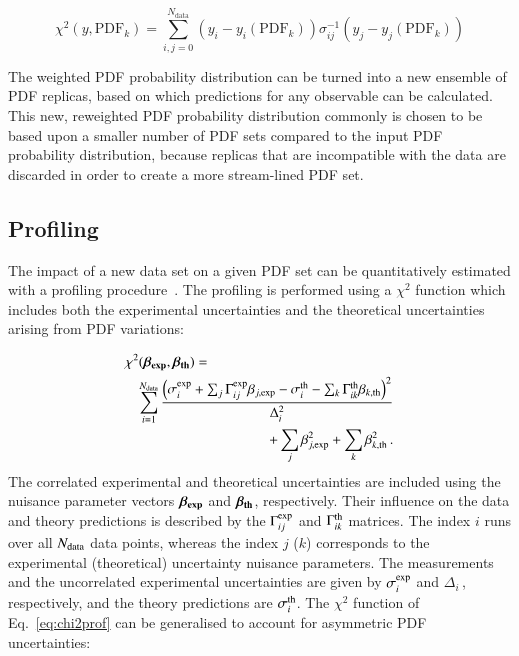 \begin{equation}
 \chi^2 (y,\mathrm{PDF}_k) = \sum_{i,j=0}^{N_{\mathrm{data}}} (y_i - y_i(\mathrm{PDF}_k)) \sigma^{-1}_{ij} (y_j-y_j(\mathrm{PDF}_k))  
\end{equation}

The weighted PDF probability distribution can be turned into a new ensemble of PDF replicas, based on which predictions for any observable can be calculated. This new, reweighted PDF probability distribution commonly is chosen to be based upon a smaller number of PDF sets compared to the input PDF probability distribution, because replicas that are incompatible with the data are discarded 
in order to create a more stream-lined PDF set.

\subsection{Profiling}

The impact of a new data set on a given PDF set can be quantitatively
estimated with a profiling procedure~\cite{Paukkunen:2014zia}. The
profiling is performed using a $\chi^2$ function which includes both
the experimental uncertainties and the theoretical uncertainties
arising from PDF variations:

\begin{eqnarray}
\nonumber \lefteqn{\chi^2(\boldsymbol{\beta_{\rm exp}},\boldsymbol{\beta_{\rm th}}) = }  \\ 
&& \nonumber \sum_{i=1}^{N_{\rm data}} \frac{\textstyle \left( \sigma^{\rm exp}_i + \sum_j \Gamma^{\rm exp}_{ij} \beta_{j,\rm exp} - \sigma^{\rm th}_i - \sum_k \Gamma^{\rm th}_{ik}\beta_{k,\rm th} \right)^2}{\Delta_i^2} \\
&&   + \sum_j \beta_{j,\rm exp}^2 + \sum_k \beta_{k,\rm th}^2\,.   \label{eq:chi2prof}
\end{eqnarray}
The correlated experimental and theoretical uncertainties are included
using the nuisance parameter vectors $\boldsymbol{\beta_{\rm exp}}$
and $\boldsymbol{\beta_{\rm th}}$, respectively. Their influence on
the data and theory predictions is described by the $\Gamma^{\rm
exp}_{ij}$ and $\Gamma^{\rm th}_{ik}$ matrices. The index $i$ runs
over all $N_{\rm data}$ data points, whereas the index $j$ ($k$)
corresponds to the experimental (theoretical) uncertainty nuisance
parameters. The measurements and the uncorrelated experimental
uncertainties are given by $\sigma^{\rm exp}_i$ and $\Delta_i$\,, respectively, and
the theory predictions are $\sigma_i^{\rm th}$. The $\chi^2$ function of
Eq.~\ref{eq:chi2prof} can be generalised to account for asymmetric PDF
uncertainties:

